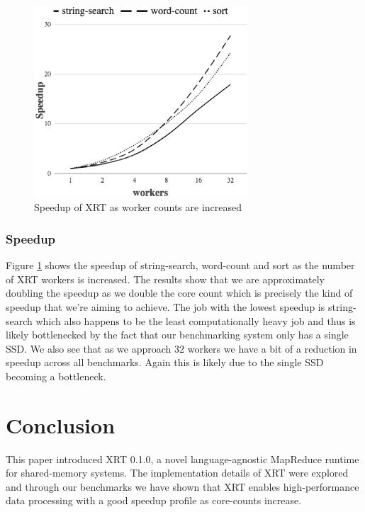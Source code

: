 \documentclass[twocolumn,11px]{article}       %
\begin{document}
\begin{figure}[h]
  \centering
  \includegraphics[width=8cm]{graph.eps}
  \caption{Speedup of XRT as worker counts are increased}
  \label{fig:perf}
\end{figure}

\subsubsection{Speedup}

Figure \ref{fig:perf} shows the speedup of string-search, word-count and sort as the number of XRT workers is increased.
The results show that we are approximately doubling the speedup as we double the core count which is precisely the kind of speedup that we're aiming to achieve.
The job with the lowest speedup is string-search which also happens to be the least computationally heavy job and thus is likely bottlenecked by the fact that our benchmarking system only has a single SSD.
We also see that as we approach 32 workers we have a bit of a reduction in speedup across all benchmarks.
Again this is likely due to the single SSD becoming a bottleneck.

\section{Conclusion} \label{sec:concl}

This paper introduced XRT 0.1.0, a novel language-agnostic MapReduce runtime for shared-memory systems.
The implementation details of XRT were explored and through our benchmarks we have shown that XRT enables high-performance data processing with a good speedup profile as core-counts increase.
\end{document}
